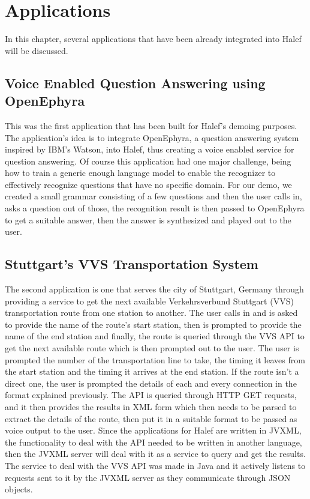\chapter{Applications}
\label{chap:applications}
In this chapter, several applications that have been already integrated into Halef will be discussed.

\section{Voice Enabled Question Answering using OpenEphyra}
This was the first application that has been built for Halef's demoing purposes.
The application's idea is to integrate OpenEphyra, a question answering system inspired by IBM's Watson, into Halef, thus creating a voice enabled service for question answering.
Of course this application had one major challenge, being how to train a generic enough language model to enable the recognizer to effectively recognize questions that have no specific domain.
For our demo, we created a small grammar consisting of a few questions and then the user calls in, asks a question out of those, the recognition result is then passed to OpenEphyra to get a suitable answer, then the answer is synthesized and played out to the user.

\section{Stuttgart's VVS Transportation System}
The second application is one that serves the city of Stuttgart, Germany through providing a service to get the next available Verkehrsverbund Stuttgart (VVS) transportation route from one station to another.
The user calls in and is asked to provide the name of the route's start station, then is prompted to provide the name of the end station and finally, the route is queried through the VVS API to get the next available route which is then prompted out to the user.
The user is prompted the number of the transportation line to take, the timing it leaves from the start station and the timing it arrives at the end station.
If the route isn't a direct one, the user is prompted the details of each and every connection in the format explained previously.
The API is queried through HTTP GET requests, and it then provides the results in XML form which then needs to be parsed to extract the details of the route, then put it in a suitable format to be passed as voice output to the user.
Since the applications for Halef are written in JVXML, the functionality to deal with the API needed to be written in another language, then the JVXML server will deal with it as a service to query and get the results.
The service to deal with the VVS API was made in Java and it actively listens to requests sent to it by the JVXML server as they communicate through JSON objects.
